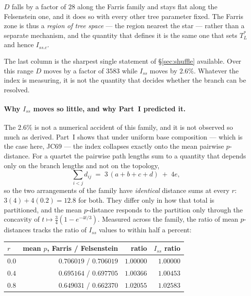 \documentclass[preprint,12pt,authoryear]{elsarticle}
\newcommand{\Iss}{I_{ss}}
\newcommand{\Issc}{I_{ss.c}}
\newcommand{\TLstar}{T_L^{*}}
\theoremstyle{definition}
\theoremstyle{remark}
\begin{document}
$D$ falls by a factor of $28$ along the Farris family and stays flat
along the Felsenstein one, and it does so with every other tree parameter
fixed. The Farris zone is thus a \emph{region of tree space} --- the region
nearest the star --- rather than a separate mechanism, and the quantity that
defines it is the same one that sets $\TLstar$ and hence $\Issc$.

The last column is the sharpest single statement of \S\ref{sec:shuffle}
available. Over this range $D$ moves by a factor of $3583$ while $\Iss$
moves by $2.6\%$. Whatever the index is measuring, it is not the quantity
that decides whether the branch can be resolved.

\paragraph{Why $\Iss$ moves so little, and why Part~I predicted
it.} The $2.6\%$ is not a numerical accident of this family, and it is not
observed so much as derived. Part~I \citep{xu2026preprint}
shows that under uniform base composition --- which is the case here, JC69
--- the index collapses exactly onto the mean pairwise $p$-distance. For a
quartet the pairwise path lengths sum to a quantity that depends only on the
branch lengths and not on the topology,
\begin{equation}
\sum_{i<j} d_{ij} \;=\; 3\,(a+b+c+d) \;+\; 4e ,
\label{eq:pairs}
\end{equation}
so the two arrangements of the family have \emph{identical} distance sums at
every $r$: $3(4)+4(0.2)=12.8$ for both. They differ only in how that total
is partitioned, and the mean $p$-distance responds to the partition only
through the concavity of $t\mapsto\frac34(1-e^{-4t/3})$. Measured across the
family, the ratio of mean $p$-distances tracks the ratio of $\Iss$ values to
within half a percent:

\begin{center}
\begin{tabular}{lrrr}
\toprule
$r$ & mean $p$, Farris / Felsenstein & ratio & $\Iss$ ratio \\
\midrule
$0.0$ & $0.706019$ / $0.706019$ & $1.00000$ & $1.00000$ \\
$0.4$ & $0.695164$ / $0.697705$ & $1.00366$ & $1.00453$ \\
$0.8$ & $0.649031$ / $0.662370$ & $1.02055$ & $1.02583$ \\
\bottomrule
\end{tabular}
\end{center}
\end{document}
